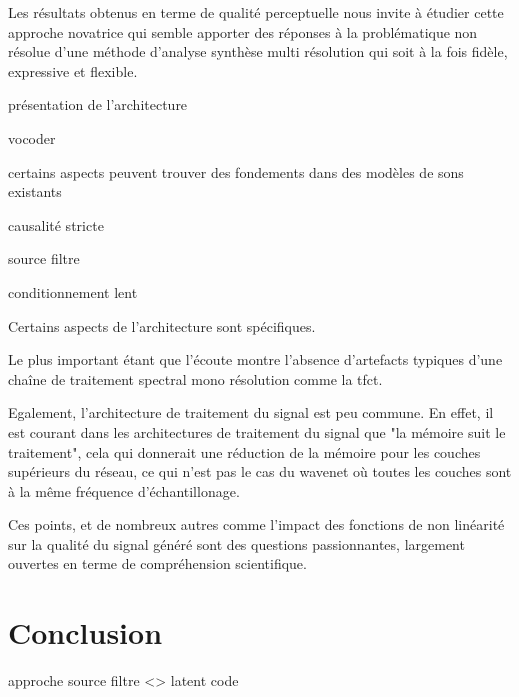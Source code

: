 Les résultats obtenus en terme de qualité perceptuelle nous invite à étudier cette approche novatrice qui semble apporter des réponses à la problématique non résolue d'une méthode d'analyse synthèse multi résolution qui soit à la fois fidèle, expressive et flexible.

présentation de l'architecture

vocoder

certains aspects peuvent trouver des fondements dans des modèles de sons existants

causalité stricte

source filtre

conditionnement lent

Certains aspects de l'architecture sont spécifiques.

Le plus important étant que l'écoute montre l'absence d'artefacts typiques d'une chaîne de traitement spectral mono résolution comme la tfct.

Egalement, l'architecture de traitement du signal est peu commune. En effet, il est courant dans les architectures de traitement du signal que "la mémoire suit le traitement", cela qui donnerait une réduction de la mémoire pour les couches supérieurs du réseau, ce qui n'est pas le cas du wavenet où toutes les couches sont à la même fréquence d'échantillonage.

Ces points, et de nombreux autres comme l'impact des fonctions de non linéarité sur la qualité du signal généré sont des questions passionnantes, largement ouvertes en terme de compréhension scientifique.

\section{Conclusion}

approche source filtre <> latent code
